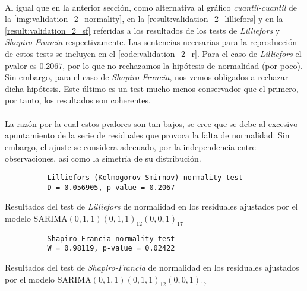 \documentclass[a4paper, spanish]{article}
\begin{document}
      \paragraph{}
      Al igual que en la anterior sección, como alternativa al gráfico \emph{cuantil-cuantil} de la \autoref{img:validation_2_normality}, en la \autoref{result:validation_2_lilliefors} y en la \autoref{result:validation_2_sf} referidas a los resultados de los tests de \emph{Lilliefors} y \emph{Shapiro-Francia} respectivamente. Las sentencias necesarias para la reproducción de estos tests se incluyen en el \autoref{code:validation_2_r}. Para el caso de \emph{Lilliefors} el pvalor es $0.2067$, por lo que no rechazamos la hipótesis de normalidad (por poco). Sin embargo, para el caso de \emph{Shapiro-Francia}, nos vemos obligados a rechazar dicha hipótesis. Este último es un test mucho menos conservador que el primero, por tanto, los resultados son coherentes.

      \paragraph{}
      La razón por la cual estos pvalores son tan bajos, se cree que se debe al excesivo apuntamiento de la serie de residuales que provoca la falta de normalidad. Sin embargo, el  ajuste se considera adecuado, por la independencia entre observaciones, así como la simetría de su distribución.

      \begin{table}[htb!]
        \begin{Verbatim}
          Lilliefors (Kolmogorov-Smirnov) normality test
          D = 0.056905, p-value = 0.2067
        \end{Verbatim}
        \caption{Resultados del test de \emph{Lilliefors} de normalidad en los residuales ajustados por el modelo $\text{SARIMA}(0, 1, 1)(0, 1, 1)_{12}(0, 0, 1)_{17}$}
        \label{result:validation_2_lilliefors}
      \end{table}

      \begin{table}[htb!]
        \begin{Verbatim}
          Shapiro-Francia normality test
          W = 0.98119, p-value = 0.02422
        \end{Verbatim}
        \caption{Resultados del test de \emph{Shapiro-Francia} de normalidad en los residuales ajustados por el modelo $\text{SARIMA}(0, 1, 1)(0, 1, 1)_{12}(0, 0, 1)_{17}$}
        \label{result:validation_2_sf}
      \end{table}
\end{document}
